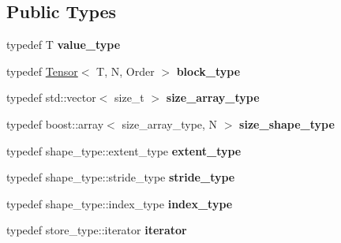 \subsection*{Public Types}
\begin{DoxyCompactItemize}
\item 
\hypertarget{classbtas_1_1_block_sp_tensor_a8cb8f24b23c645b0514bc780bb9d5bd3}{
typedef T {\bfseries value\_\-type}}
\label{classbtas_1_1_block_sp_tensor_a8cb8f24b23c645b0514bc780bb9d5bd3}

\item 
\hypertarget{classbtas_1_1_block_sp_tensor_a5579c84065948860831611b61fb7ae0f}{
typedef \hyperlink{classbtas_1_1_tensor}{Tensor}$<$ T, N, Order $>$ {\bfseries block\_\-type}}
\label{classbtas_1_1_block_sp_tensor_a5579c84065948860831611b61fb7ae0f}

\item 
\hypertarget{classbtas_1_1_block_sp_tensor_a24060f266dc86df90b8fa15156bf0be5}{
typedef std::vector$<$ size\_\-t $>$ {\bfseries size\_\-array\_\-type}}
\label{classbtas_1_1_block_sp_tensor_a24060f266dc86df90b8fa15156bf0be5}

\item 
\hypertarget{classbtas_1_1_block_sp_tensor_a0e89a91df4bbb04502bc07795f507f6c}{
typedef boost::array$<$ size\_\-array\_\-type, N $>$ {\bfseries size\_\-shape\_\-type}}
\label{classbtas_1_1_block_sp_tensor_a0e89a91df4bbb04502bc07795f507f6c}

\item 
\hypertarget{classbtas_1_1_block_sp_tensor_ae376b43518e1a268cfa15ea93a202fc0}{
typedef shape\_\-type::extent\_\-type {\bfseries extent\_\-type}}
\label{classbtas_1_1_block_sp_tensor_ae376b43518e1a268cfa15ea93a202fc0}

\item 
\hypertarget{classbtas_1_1_block_sp_tensor_afd08a4f83e519cba73099d8acd76ec70}{
typedef shape\_\-type::stride\_\-type {\bfseries stride\_\-type}}
\label{classbtas_1_1_block_sp_tensor_afd08a4f83e519cba73099d8acd76ec70}

\item 
\hypertarget{classbtas_1_1_block_sp_tensor_a62cdc03d7b661491acf4264ec98e63ae}{
typedef shape\_\-type::index\_\-type {\bfseries index\_\-type}}
\label{classbtas_1_1_block_sp_tensor_a62cdc03d7b661491acf4264ec98e63ae}

\item 
\hypertarget{classbtas_1_1_block_sp_tensor_adb373c48e37b614ac0639bc0c0b191de}{
typedef store\_\-type::iterator {\bfseries iterator}}
\label{classbtas_1_1_block_sp_tensor_adb373c48e37b614ac0639bc0c0b191de}


\end{DoxyCompactItemize}
